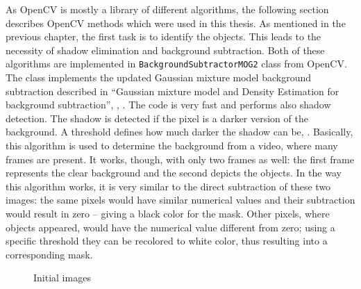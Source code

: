       As OpenCV is mostly a library of different algorithms, the following section describes OpenCV methods which were used in this thesis. As mentioned in the previous chapter, the first task is to identify the objects. This leads to the necessity of shadow elimination and background subtraction. Both of these algorithms are implemented in \verb|BackgroundSubtractorMOG2| class from OpenCV. The class implements the updated Gaussian mixture model background subtraction described in ``Gaussian mixture model and Density Estimation for background subtraction'', \cite{zivkovic},  \cite{heijden}. The code is very fast and performs also shadow detection. The shadow is detected if the pixel is a darker version of the background. A threshold defines how much darker the shadow can be, \cite{prati}. Basically, this algorithm is used to determine the background from a video, where many frames are present. It works, though, with only two frames as well: the first frame represents the clear background and the second depicts the objects. In the way this algorithm works, it is very similar to the direct subtraction of these two images: the same pixels would have similar numerical values and their subtraction would result in zero -- giving a black color for the mask. Other pixels, where objects appeared, would have the numerical value different from zero; using a specific threshold they can be recolored to white color, thus resulting into a corresponding mask.

      \begin{figure}[t]
        \centering
        \hfil 
        \caption{Initial images}
        \label{backgroundAndObjects}
      \end{figure}

